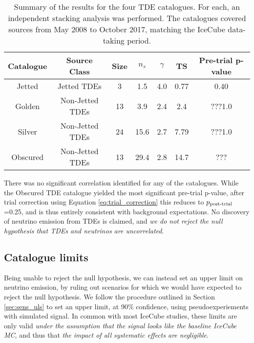 \begin{table*}[]
	\centering
	\begin{tabular}{||c c c| c c c | c||} 
		\hline
		Catalogue & Source Class & Size & $n_{s}$  & $\gamma$ & TS & Pre-trial p-value\\ [0.5ex] 
		\hline\hline
		Jetted & Jetted TDEs &  3 & 1.5& 4.0&0.77&0.40\\ 
		\hline
		Golden & Non-Jetted TDEs & 13 &3.9&2.4& 2.4&???1.0\\
		\hline
		Silver & Non-Jetted TDEs & 24 &15.6&2.7&7.79& ???1.0\\
		\hline
		Obscured & Non-Jetted TDEs & 13 &29.4&2.8&14.7&???\\[1ex] 
		\hline
	\end{tabular}
	\caption{Summary of the results for the four TDE catalogues. For each, an independent stacking analysis was performed. The catalogues covered sources from May 2008 to October 2017, matching the IceCube data-taking period.}
	\label{tab:stacking_tests}
\end{table*}{}

There was no significant correlation identified for any of the catalogues. While the Obscured TDE catalogue yielded the most significant pre-trial p-value, after trial correction using Equation \ref{eq:trial_correction} this reduces to $p_{\textup{post-trial}}$=0.25, and is thus entirely consistent with background expectations. No discovery of neutrino emission from TDEs is claimed, and \emph{we do not reject the null hypothesis that TDEs and neutrinos are uncorrelated}.

\subsection{Catalogue limits}

Being unable to reject the null hypothesis, we can instead set an upper limit on neutrino emission, by ruling out scenarios for which we would have expected to reject the null hypothesis. We follow the procedure outlined in Section \ref{sec:sens_uls} to set an upper limit, at 90\% confidence, using pseudoexperiements with simulated signal. In common with most IceCube studies, these limits are only valid \emph{under the assumption that the signal looks like the baseline IceCube MC}, and thus that \emph{the impact of all systematic effects are negligible}.

